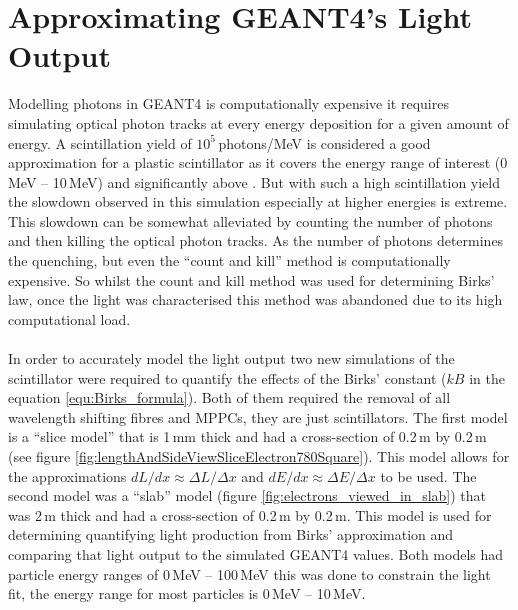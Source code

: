 \section{Approximating GEANT4's Light Output}\label{sec:GEANT4Simulation_MonteCarloBirksLaw}
Modelling photons in GEANT4 is computationally expensive it requires simulating optical photon tracks at every energy deposition for a given amount of energy. A scintillation yield of $10^5$\,photons/MeV is considered a good approximation for a plastic scintillator as it covers the energy range of interest (0\,MeV -- 10\,MeV) and significantly above \cite{craun_1970}. But with such a high scintillation yield the slowdown observed in this simulation especially at higher energies is extreme. This slowdown can be somewhat alleviated by counting the number of photons and then killing the optical photon tracks. As the number of photons determines the quenching, but even the ``count and kill'' method is computationally expensive. So whilst the count and kill method was used for determining Birks' law, once the light was characterised this method was abandoned due to its high computational load.
\\\\In order to accurately model the light output two new simulations of the scintillator were required to quantify the effects of the Birks' constant ($kB$ in the equation \ref{equ:Birks_formula}). Both of them required the removal of all wavelength shifting fibres and MPPCs, they are just scintillators. The first model is a ``slice model'' that is 1\,mm thick and had a cross-section of 0.2\,m by 0.2\,m (see figure \ref{fig:lengthAndSideViewSliceElectron780Square}). This model allows for the approximations $dL/dx \approx \Delta L / \Delta x$ and $dE/dx \approx \Delta E / \Delta x$ to be used. The second model was a ``slab'' model (figure \ref{fig:electrons_viewed_in_slab}) that was 2\,m thick and had a cross-section of 0.2\,m by 0.2\,m. This model is used for determining quantifying light production from Birks' approximation and comparing that light output to the simulated GEANT4 values. Both models had particle energy ranges of 0\,MeV -- 100\,MeV this was done to constrain the light fit, the energy range for most particles is 0\,MeV -- 10\,MeV.

